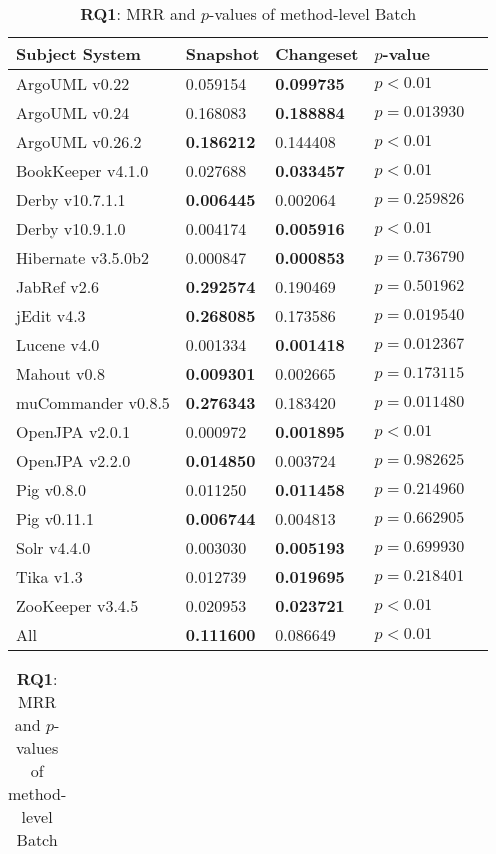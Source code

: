 \begin{table}[t]
\renewcommand{\arraystretch}{1.3}
\footnotesize
\centering
\caption{{\bf RQ1}: MRR and $p$-values of class-level Batch}
\begin{tabular}{l|ll|ll}
\toprule
Subject System & Snapshot & Changeset & $p$-value  \\
\midrule
ArgoUML v0.22 & 0.059154 & {\bf 0.099735 } & $p < 0.01$ \\
ArgoUML v0.24 & 0.168083 & {\bf 0.188884 } & $p = 0.013930$ \\
ArgoUML v0.26.2 & {\bf 0.186212 } & 0.144408 & $p < 0.01$ \\
BookKeeper v4.1.0 & 0.027688 & {\bf 0.033457 } & $p < 0.01$ \\
Derby v10.7.1.1 & {\bf 0.006445 } & 0.002064 & $p = 0.259826$ \\
Derby v10.9.1.0 & 0.004174 & {\bf 0.005916 } & $p < 0.01$ \\
Hibernate v3.5.0b2 & 0.000847 & {\bf 0.000853 } & $p = 0.736790$ \\
JabRef v2.6 & {\bf 0.292574 } & 0.190469 & $p = 0.501962$ \\
jEdit v4.3 & {\bf 0.268085 } & 0.173586 & $p = 0.019540$ \\
Lucene v4.0 & 0.001334 & {\bf 0.001418 } & $p = 0.012367$ \\
Mahout v0.8 & {\bf 0.009301 } & 0.002665 & $p = 0.173115$ \\
muCommander v0.8.5 & {\bf 0.276343 } & 0.183420 & $p = 0.011480$ \\
OpenJPA v2.0.1 & 0.000972 & {\bf 0.001895 } & $p < 0.01$ \\
OpenJPA v2.2.0 & {\bf 0.014850 } & 0.003724 & $p = 0.982625$ \\
Pig v0.8.0 & 0.011250 & {\bf 0.011458 } & $p = 0.214960$ \\
Pig v0.11.1 & {\bf 0.006744 } & 0.004813 & $p = 0.662905$ \\
Solr v4.4.0 & 0.003030 & {\bf 0.005193 } & $p = 0.699930$ \\
Tika v1.3 & 0.012739 & {\bf 0.019695 } & $p = 0.218401$ \\
ZooKeeper v3.4.5 & 0.020953 & {\bf 0.023721 } & $p < 0.01$ \\
\midrule
All & {\bf 0.111600 } & 0.086649 & $p < 0.01$ \\
\bottomrule
\end{tabular}
\label{table:rq1:class:lda}
\caption{{\bf RQ1}: MRR and $p$-values of method-level Batch}
\begin{tabular}{l|ll|ll}

\end{tabular}
\end{table}
